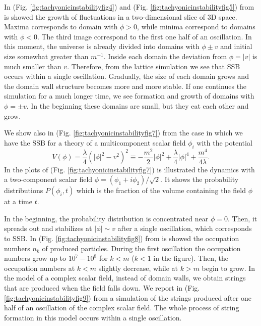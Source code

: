 \documentclass[11pt,a4paper,twoside]{book}
\begin{document}
In (Fig. \ref{fig:tachyonicinstabilityfig4}) and (Fig. \ref{fig:tachyonicinstabilityfig5}) from \cite{Chap5:TachyonicInstability} is showed the growth of fluctuations in a two-dimensional slice of 3D space. Maxima corresponds to domain with $\phi > 0$, while minima correspond to domains with $\phi < 0$. The third image correspond to the first one half of an oscillation. In this moment, the universe is already divided into domains with $ \phi \pm v $ and initial  size somewhat greater than $ m^{-1} $. Inside  each domain the deviation from $ \phi = |v| $ is much smaller than $ v $. Therefore, from the lattice simulation we see that SSB occurs within a single oscillation. Gradually, the size of each domain grows and the domain wall structure becomes more and more stable. If one continues the simulation for a much longer time, we see  formation and growth of domains with $ \phi=\pm v $. In the beginning these domains are small, but they eat each other and grow.

We show also in (Fig. \ref{fig:tachyonicinstabilityfig7}) from \cite{Chap5:TachyonicInstability} the case in which we have the SSB for a theory of a multicomponent scalar field $ \phi_{i} $ with the potential
\begin{equation}
	\label{Chap5:TachyonicModelComplex}
	V(\phi)=\frac{\lambda}{4}(|\phi|^{2}-v^{2})^{2} \equiv -\frac{m^{2}}{2}|\phi|^{2} + \frac{\lambda}{4}|\phi|^{4} + \frac{m^{4}}{4\lambda}.
\end{equation} 
In the plots of (Fig. \ref{fig:tachyonicinstabilityfig7}) is illustrated the dynamics with a two-component scalar field $\phi = (\phi_{1} + i\phi_{2})/\sqrt{2}$. It shows the probability distributions $ P(\phi_{i},t) $ which is the fraction of the volume containing the field $\phi$ at a time $ t $.

In the beginning,  the probability distribution is concentrated near $\phi=0$. Then, it spreads out and stabilizes at $ |\phi|\sim v $ after a single oscillation, which corresponds to SSB. In (Fig. \ref{fig:tachyonicinstabilityfig8}) from \cite{Chap5:TachyonicInstability} is showed the occupation numbers $ n_{k} $ of produced particles. During the first oscillation the occupation numbers grow up to $ 10^{7}-10^{8} $ for $ k < m $ ($ k < 1 $ in the figure). Then, the occupation numbers at $ k < m $ slightly decrease, while at $ k > m $ begin to grow. In the model of a complex scalar field, instead of domain walls, we obtain strings that are produced when the field falls down. We report in (Fig. \ref{fig:tachyonicinstabilityfig9}) from \cite{Chap5:TachyonicInstability} a simulation of the strings produced after one half of an oscillation of the complex scalar field. The whole process of string formation in this model occurs within a single oscillation.
\end{document}
